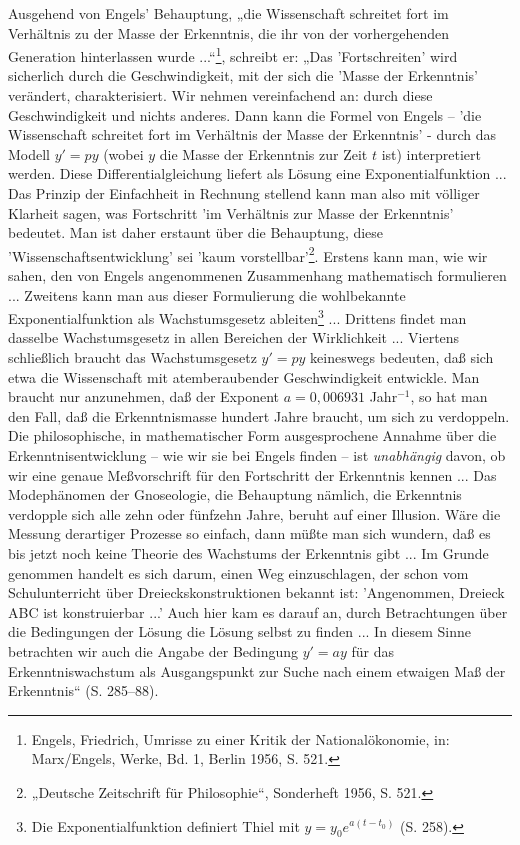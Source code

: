 ﻿\documentclass[11pt,a4paper]{article}
\begin{document}
Ausgehend von Engels' Behauptung, „die Wissenschaft schreitet fort im
Verhältnis zu der Masse der Erkenntnis, die ihr von der vorhergehenden
Generation hinterlassen wurde ...“\footnote{Engels, Friedrich, Umrisse zu
  einer Kritik der Nationalökonomie, in: Marx/Engels, Werke, Bd. 1, Berlin
  1956, S. 521.}, schreibt er: „Das 'Fortschreiten' wird sicherlich durch die
Geschwindigkeit, mit der sich die 'Masse der Erkenntnis' verändert,
charakterisiert. Wir nehmen vereinfachend an: durch diese Geschwindigkeit und
nichts anderes. Dann kann die Formel von Engels -- 'die Wissenschaft schreitet
fort im Verhältnis der Masse der Erkenntnis' - durch das Modell $y' = py$
(wobei $y$ die Masse der Erkenntnis zur Zeit $t$ ist) interpretiert
werden. Diese Differentialgleichung liefert als Lösung eine
Exponentialfunktion ... Das Prinzip der Einfachheit in Rechnung stellend kann
man also mit völliger Klarheit sagen, was Fortschritt 'im Verhältnis zur Masse
der Erkenntnis' bedeutet. Man ist daher erstaunt über die Behauptung, diese
'Wissenschaftsentwicklung' sei 'kaum vorstellbar'\footnote{„Deutsche
  Zeitschrift für Philosophie“, Sonderheft 1956, S. 521.}. Erstens kann man,
wie wir sahen, den von Engels angenommenen Zusammenhang mathematisch
formulieren ... Zweitens kann man aus dieser Formulierung die wohlbekannte
Exponentialfunktion als Wachstumsgesetz ableiten\footnote{Die
  Exponentialfunktion definiert Thiel mit $y = y_0e^{a(t-t_0)}$ (S. 258).} ...
Drittens findet man dasselbe Wachstumsgesetz in allen Bereichen der
Wirklichkeit ... Viertens schließlich braucht das Wachstumsgesetz $y' = py$
keineswegs bedeuten, daß sich etwa die Wissenschaft mit atemberaubender
Geschwindigkeit entwickle. Man braucht nur anzunehmen, daß der Exponent $a =
0,006931$ Jahr$^{-1}$, so hat man den Fall, daß die Erkenntnismasse hundert
Jahre braucht, um sich zu verdoppeln. Die philosophische, in mathematischer
Form ausgesprochene Annahme über die Erkenntnisentwicklung -- wie wir sie bei
Engels finden -- ist \emph{unabhängig} davon, ob wir eine genaue Meßvorschrift
für den Fortschritt der Erkenntnis kennen ... Das Modephänomen der
Gnoseologie, die Behauptung nämlich, die Erkenntnis verdopple sich alle zehn
oder fünfzehn Jahre, beruht auf einer Illusion. Wäre die Messung derartiger
Prozesse so einfach, dann müßte man sich wundern, daß es bis jetzt noch keine
Theorie des Wachstums der Erkenntnis gibt ... Im Grunde genommen handelt es
sich darum, einen Weg einzuschlagen, der schon vom Schulunterricht über
Dreieckskonstruktionen bekannt ist: 'Angenommen, Dreieck ABC ist konstruierbar
...' Auch hier kam es darauf an, durch Betrachtungen über die Bedingungen der
Lösung die Lösung selbst zu finden ... In diesem Sinne betrachten wir auch die
Angabe der Bedingung $y'=ay$ für das Erkenntniswachstum als Ausgangspunkt zur
Suche nach einem etwaigen Maß der Erkenntnis“ (S. 285--88).
\end{document}
